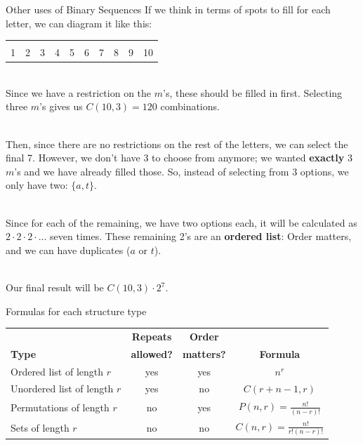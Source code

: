 {\begin{intro}{Other uses of Binary Sequences}
		If we think in terms of spots to fill for each letter, we can diagram it like this:
		
		\begin{center}
			\begin{tabular}{c c c c c c c c c c}
				\fitb[0.5cm] & \fitb[0.5cm] & \fitb[0.5cm] & \fitb[0.5cm] & \fitb[0.5cm] & \fitb[0.5cm] & \fitb[0.5cm] & \fitb[0.5cm] & \fitb[0.5cm] & \fitb[0.5cm]
				\\
				1 & 2 & 3 & 4 & 5 & 6 & 7 & 8 & 9 & 10
			\end{tabular}
		\end{center}
		
		~\\ Since we have a restriction on the $m$'s, these should be filled in first. Selecting three $m$'s gives us
		$C(10,3) = 120$ combinations.
		
		~\\ Then, since there are no restrictions on the rest of the letters, we can select the final 7.
		However, we don't have 3 to choose from anymore; we wanted \textbf{exactly} 3 $m$'s and we have
		already filled those. So, instead of selecting from 3 options, we only have two: $\{a, t\}$.
		
		~\\ Since for each of the remaining, we have two options each, it will be calculated as $2 \cdot 2 \cdot 2 \cdot ...$
		seven times. These remaining 2's are an \textbf{ordered list}: Order matters, and we can have duplicates ($a$ or $t$).
		
		~\\ Our final result will be $C(10,3) \cdot 2^{7}$.
	\end{intro}
	
    \begin{intro}{Formulas for each structure type}
	
		\begin{center}
			\begin{tabular}{l | c | c | c }
				\textbf{}
					& \textbf{Repeats}
					& \textbf{Order}
					& \textbf{}
				\\
				\textbf{Type}
					& \textbf{allowed?}
					& \textbf{matters?}
					& \textbf{Formula}
				\\ \hline
				Ordered list of length $r$
					& yes
					& yes
					& $n^{r}$

				\\ \hline
				Unordered list of length $r$
					& yes
					& no
					& $C(r + n - 1, r)$
				\\ \hline
				Permutations of length $r$
					& no
					& yes
					& $P(n,r) = \frac{n!}{(n-r)!}$
				\\ \hline
				Sets of length $r$
					& no
					& no
					& $C(n,r) = \frac{n!}{r!(n-r)!}$
			\end{tabular}
		\end{center}
        

\end{intro}}
